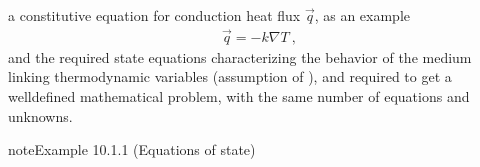 \documentclass[letterpaper,10pt,english]{jupyterBook}
\begin{document}
\sphinxAtStartPar
a constitutive equation for conduction heat flux \(\vec{q}\), as an example 
\begin{equation*}
\begin{split}\vec{q} = - k \nabla T \ ,\end{split}
\end{equation*}
\sphinxAtStartPar
and the required state equations characterizing the behavior of the medium linking thermodynamic variables (assumption of   ), and required to get a well\sphinxhyphen{}defined mathematical problem, with the same number of equations and unknowns.
\label{ch/fluids/governing-equations:example-0}
\begin{sphinxadmonition}{note}{Example 10.1.1 (Equations of state)}




\end{sphinxadmonition}
\end{document}
